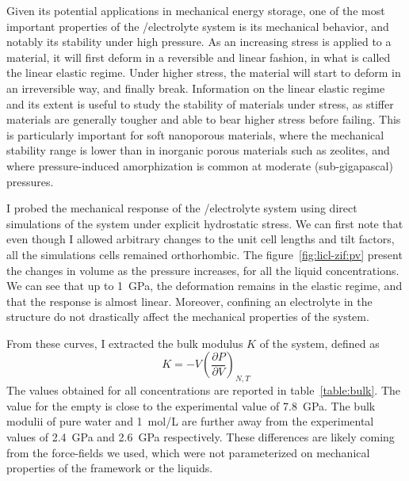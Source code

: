 \documentclass[thesis]{subfiles}
\begin{document}
Given its potential applications in mechanical energy storage, one of the most
important properties of the /electrolyte system is its mechanical behavior,
and notably its stability under high pressure. As an increasing stress is
applied to a material, it will first deform in a reversible and linear fashion,
in what is called the linear elastic regime. Under higher stress, the
material will start to deform in an irreversible way, and finally break.
Information on the linear elastic regime and its extent is useful to study the
stability of materials under stress, as stiffer materials are generally tougher
and able to bear higher stress before failing. This is particularly important
for soft nanoporous materials, where the mechanical stability range is lower
than in inorganic porous materials such as zeolites, and where pressure-induced
amorphization is common at moderate (sub-gigapascal)
pressures\cite{Bennett2011, Cao2012, AOrtiz2013}.

I probed the mechanical response of the /electrolyte system using direct
simulations of the system under explicit hydrostatic stress. We can first note
that even though I allowed arbitrary changes to the unit cell lengths and tilt
factors, all the simulations cells remained orthorhombic. The
figure~\ref{fig:licl-zif:pv} present the changes in volume as the pressure
increases, for all the liquid concentrations. We can see that up to \SI{1}{GPa},
the deformation remains in the elastic regime, and that the response is almost
linear. Moreover, confining an electrolyte in the  structure do not
drastically affect the mechanical properties of the system.

From these curves, I extracted the bulk modulus $K$ of the system, defined as
\[K = -V\left(\frac{\partial P}{\partial V}\right)_{N,T}\]
The values obtained for all concentrations are reported in
table~\ref{table:bulk}. The value for the empty  is close to the
experimental\cite{Tan2012} value of \SI{7.8}{GPa}. The bulk modulii of pure
water and \SI{1}{mol/L} are further away from the experimental
values\cite{Lanman1934} of \SI{2.4}{GPa} and \SI{2.6}{GPa} respectively. These
differences are likely coming from the force-fields we used, which were not
parameterized on mechanical properties of the framework or the liquids.
\end{document}
